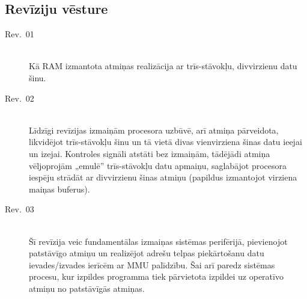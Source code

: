 ﻿\subsection{Revīziju vēsture} \label{sec:sys-revs}

\begin{description}
	\item[Rev.~01] \hfill \\
		Kā RAM izmantota atmiņas realizācija ar 
		trīs-stāvokļu, divvirzienu datu šinu.
	\item[Rev.~02] \hfill \\
		Līdzīgi revīzijas izmaiņām procesora uzbūvē, arī atmiņa pārveidota,
		likvidējot trīs-stāvokļu šinu un tā vietā divas vienvirziena šinas
		datu ieejai un izejai. Kontroles signāli atstāti bez izmaiņām,
		tādējādi atmiņa vēljoprojām „emulē” trīs-stāvokļu datu apmaiņu,
		saglabājot procesora iespēju strādāt ar divvirzienu šinas atmiņu
		(papildus izmantojot virziena maiņas buferus).
	\item[Rev.~03] \hfill \\
		Šī revīzija veic fundamentālas izmaiņas sistēmas perifērijā,
		pievienojot patstāvīgo atmiņu un realizējot adrešu telpas
		piekārtošanu datu ievades/izvades ierīcēm ar MMU palīdzību.
		Šai arī paredz sistēmas  procesu, kur izpildes
		programma tiek pārvietota izpildei uz operatīvo atmiņu no
		patstāvīgās atmiņas.
\end{description}
